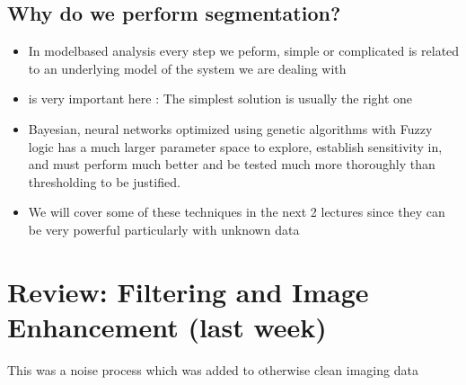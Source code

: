 \documentclass[letterpaper,10pt,english]{sphinxmanual}
\begin{document}
\section{Why do we perform segmentation?}
\label{\detokenize{04-BasicSegmentation:why-do-we-perform-segmentation}}\begin{itemize}
\item {} 
\sphinxAtStartPar
In model\sphinxhyphen{}based analysis every step we peform, simple or complicated is related to an underlying model of the system we are dealing with

\item {} 
\sphinxAtStartPar
{} is very important here : The simplest solution is usually the right one

\item {} 
\sphinxAtStartPar
Bayesian, neural networks optimized using genetic algorithms with Fuzzy logic has a much larger parameter space to explore, establish sensitivity in, and must perform much better and be tested much more thoroughly than thresholding to be justified.

\item {} 
\sphinxAtStartPar
We will cover some of these techniques in the next 2 lectures since they can be very powerful particularly with unknown data

\end{itemize}


\chapter{Review: Filtering and Image Enhancement (last week)}
\label{\detokenize{04-BasicSegmentation:review-filtering-and-image-enhancement-last-week}}
\sphinxAtStartPar
This was a noise process which was added to otherwise clean imaging data
\end{document}
